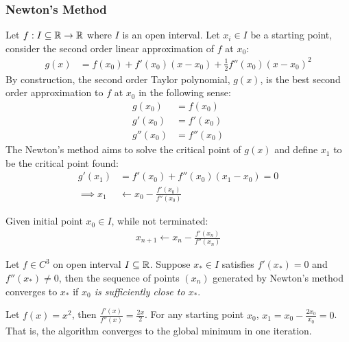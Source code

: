 \documentclass{article}
\begin{document}
	\subsubsection{Newton's Method}
	\begin{example}
		Let $f: I \subseteq \mathbb{R} \to \mathbb{R}$ where $I$ is an open interval. Let $x_i \in I$ be a starting point, consider the second order linear approximation of $f$ at $x_0$:
		\begin{align}
			g(x) &= f(x_0) + f'(x_0) (x - x_0) + \frac{1}{2} f''(x_0) (x - x_0)^2
		\end{align}
		By construction, the second order Taylor polynomial, $g(x)$, is the best second order approximation to $f$ at $x_0$ in the following sense:
		\begin{align}
			g(x_0) &= f(x_0) \\
			g'(x_0) &= f'(x_0) \\
			g''(x_0) &= f''(x_0)
		\end{align}
		The Newton's method aims to solve the critical point of $g(x)$ and define $x_1$ to be the critical point found:
		\begin{align}
			g'(x_1) &= f'(x_0) + f''(x_0) (x_1 - x_0) = 0 \\
			\implies x_1 &\leftarrow x_0 - \frac{f'(x_0)}{f''(x_0)}
		\end{align}
	\end{example}
	
	\begin{algorithm}
		Given initial point $x_0 \in I$, while not terminated:
		\begin{align}
			x_{n+1} \leftarrow x_n - \frac{f'(x_n)}{f''(x_n)}
		\end{align}
	\end{algorithm}
	
	\begin{theorem}
		Let $f \in C^3$ on open interval $I \subseteq \mathbb{R}$. Suppose $x_* \in I$ satisfies $f'(x_*) = 0$ and $f''(x_*) \neq 0$, then the sequence of points $(x_n)$ generated by Newton's method converges to $x_*$ if \emph{$x_0$ is sufficiently close to $x_*$}.
	\end{theorem}
	
	\begin{example}
		Let $f(x) = x^2$, then $\frac{f'(x)}{f''(x)} = \frac{2x}{2}$. For any starting point $x_0$, $x_1 = x_0 - \frac{2x_0}{x_0} = 0$. That is, the algorithm converges to the global minimum in one iteration.
	\end{example}
	
\end{document}
